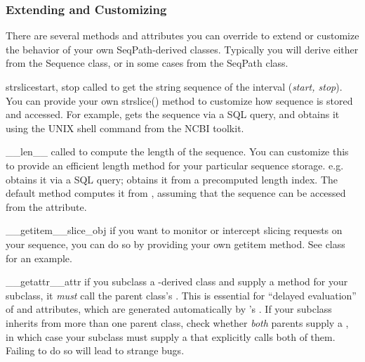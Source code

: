 \documentclass{howto}
\begin{document}
\subsubsection{Extending and Customizing}
There are several methods and attributes you can override to extend or customize
the behavior of your own SeqPath-derived classes.  Typically you will derive
either from the Sequence class, or in some cases from the SeqPath class.

\begin{funcdesc}{strslice}{start, stop} 
  called to get the string
  sequence of the interval ({\em start, stop}).  You can provide your own strslice()
  method to customize how sequence is stored and accessed.  For example,
   gets the sequence via a SQL query, and 
   obtains it using the 
  UNIX shell command from the NCBI toolkit.
\end{funcdesc}

\begin{funcdesc}{__len__}{}
  called to compute the length of the sequence.  You can
  customize this to provide an efficient length method for your particular
  sequence storage.  e.g.  obtains it via a SQL query; 
   obtains it from a precomputed length index.
  The default  method computes it from 
  , assuming that the sequence can be accessed
  from the  attribute.
\end{funcdesc}

\begin{funcdesc}{__getitem__}{slice_obj}
  if you want to monitor or intercept slicing
  requests on your sequence, you can do so by providing your own getitem method.
  See  class for an example.
\end{funcdesc}

\begin{funcdesc}{__getattr__}{attr}
  if you subclass a -derived class and supply a 
  method for your subclass, it {\em must} call the parent class's 
  .  This is essential for ``delayed evaluation'' of
   and  attributes, which are generated automatically
  by 's .  If your subclass inherits from
  more than one parent class, check whether {\em both} parents supply a 
  , in which case your subclass must supply a
   that explicitly calls both of them.  Failing to do so
  will lead to strange bugs.
\end{funcdesc}
\end{document}
